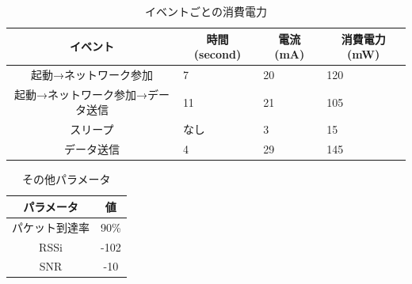 \begin{table}[]
    \caption{イベントごとの消費電力}\label{fig:LoRaWAN_PowerConsumption}
    \centering
    \begin{tabular}{|c|l|l|l|}
    \hline
    \textbf{イベント}     & \multicolumn{1}{c|}{\textbf{時間 (second)}} & \multicolumn{1}{c|}{\textbf{電流 (mA)}} & \multicolumn{1}{c|}{\textbf{消費電力 (mW)}} \\ \hline
    起動→ネットワーク参加       & 7                                         & 20                                    & 120                                     \\ \hline
    起動→ネットワーク参加→データ送信 & 11                                        & 21                                    & 105                                     \\ \hline
    スリープ              & なし                                        & 3                                     & 15                                      \\ \hline
    データ送信             & 4                                         & 29                                    & 145                                     \\ \hline
    \end{tabular}
\end{table}

\begin{table}[]
    \caption{その他パラメータ}\label{fig:LoRaWAN_Parameter}
    \centering
    \begin{tabular}{|c|c|}
    \hline
    \textbf{パラメータ} & \textbf{値} \\ \hline
    パケット到達率        & 90\%       \\ \hline
    RSSi           & -102       \\ \hline
    SNR            & -10        \\ \hline
    \end{tabular}
\end{table}